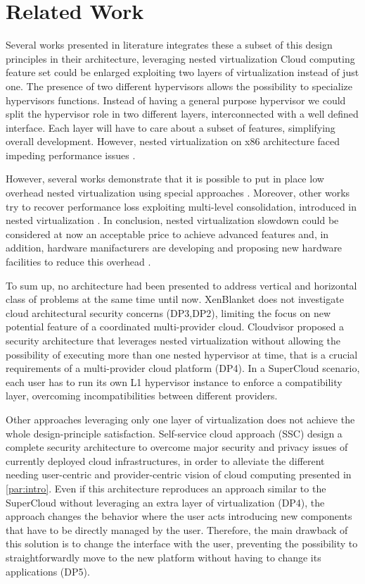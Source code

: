 \documentclass{acm_proc_article-sp} %
\begin{document}
\section{Related Work}
Several works presented in literature integrates these a subset of this design principles in their architecture, leveraging nested virtualization \cite{turtle:ibm,art:blan, cloudvisor:zhang}
Cloud computing feature set could be enlarged exploiting two layers of virtualization instead of just one. The presence of two different hypervisors allows the possibility to specialize hypervisors functions. Instead of having a general purpose hypervisor we could split the hypervisor role in two different layers, interconnected with a well defined interface.
Each layer will have to care about a subset of features, simplifying overall development.
However, nested virtualization on x86 architecture faced impeding performance issues \cite{rec:virt}.

However, several works demonstrate that it is possible to put in place low overhead nested virtualization using special approaches \cite{turtle:ibm} . Moreover, other works try to recover performance loss exploiting multi-level consolidation, introduced in nested virtualization \cite{art:blan}. In conclusion, nested virtualization slowdown could be considered at now an acceptable price to achieve advanced features and, in addition, hardware manifacturers are developing and proposing new hardware facilities to reduce this overhead \cite{vmcs:nakajima}.

To sum up, no architecture had been presented to address vertical and horizontal class of problems at the same time until now. XenBlanket does not investigate cloud architectural security concerns (DP3,DP2), limiting the focus on new potential feature of a coordinated multi-provider cloud. Cloudvisor proposed a security architecture that leverages nested virtualization without allowing the possibility of executing more than one nested hypervisor at time, that is a crucial requirements of a multi-provider cloud platform (DP4). In a SuperCloud scenario, each user has to run its own L1 hypervisor instance to enforce a compatibility layer, overcoming incompatibilities between different providers.

Other approaches leveraging only one layer of virtualization does not achieve the whole design-principle satisfaction. Self-service cloud approach (SSC) \cite{ssc:art} design a complete security architecture to overcome major security and privacy issues of currently deployed cloud infrastructures, in order to alleviate the different needing user-centric and provider-centric vision of cloud computing presented in \ref{par:intro}. Even if this architecture reproduces an approach similar to the SuperCloud without leveraging an extra layer of virtualization (DP4), the approach changes the behavior where the user acts introducing new components that have to be directly managed by the user. Therefore, the main drawback of this solution is to change the interface with the user, preventing the possibility to straightforwardly move to the new platform without having to change its applications (DP5).
\end{document}
